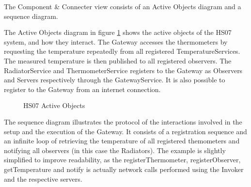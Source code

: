 \documentclass[a4paper,10pt]{article}
\begin{document}
The Component \& Connecter view consists of an Active Objects diagram and a
sequence diagram.

The Active Objects diagram in figure \ref{fig:cc_ao} shows the active objects
of the HS07 system, and how they interact. The Gateway accesses the thermometers
by requesting the temperature repeatedly from all registered TemperatureServices.
The measured temperature is then published to all registered observers. The
RadiatorService and ThermometerService registers to the Gateway as Observers and
Servers respectively through the GatewayService. It is also possible to register
to the Gateway from an internet connection.

\begin{figure}[!htb]
\caption{HS07 Active Objects}
\label{fig:cc_ao}
\end{figure}

The sequence diagram illustrates the protocol of the interactions involved in the 
setup and the execution of the Gateway. It consists of a registration sequence and 
an infinite loop of retrieving the temperature of all registered themometers and 
notifying all observers (in this case the Radiators). The example is slightly 
simplified to improve readability, as the registerThermometer, registerObserver, 
getTemperature and notify is actually network calls performed using the Invoker and 
the respective servers.

\clearpage
\end{document}
